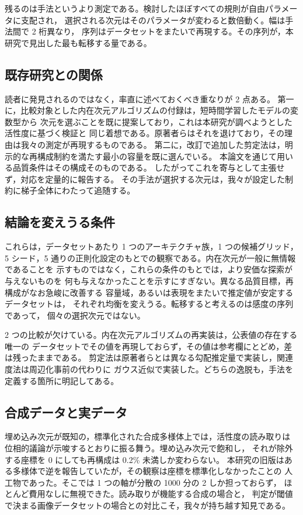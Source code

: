 \documentclass[11pt,a4paper]{jsarticle}
\begin{document}
残るのは手法というより測定である。検討したほぼすべての規則が自由パラメータに支配され，
選択される次元はそのパラメータが変わると数倍動く。幅は手法間で 2 桁異なり，
序列はデータセットをまたいで再現する。その序列が，本研究で見出した最も転移する量である。

\subsection{既存研究との関係}\label{sec:disc_related}

読者に発見されるのではなく，率直に述べておくべき重なりが 2 点ある。
第一に，比較対象とした内在次元アルゴリズムの付録は，短時間学習したモデルの変数型から
次元を選ぶことを既に提案しており，これは本研究が調べようとした活性度に基づく検証と
同じ着想である。原著者らはそれを退けており，その理由は我々の測定が再現するものである。
第二に，改訂で追加した剪定法は，明示的な再構成制約を満たす最小の容量を既に選んでいる。
本論文を通じて用いる品質条件はその構成そのものである。
したがってこれを寄与として主張せず，対応を定量的に報告する。
その手法が選択する次元は，我々が設定した制約に梯子全体にわたって追随する。

\subsection{結論を変えうる条件}\label{sec:disc_limits}

これらは，データセットあたり 1 つのアーキテクチャ族，1 つの候補グリッド，
5 シード，5 通りの正則化設定のもとでの観察である。内在次元が一般に無情報であることを
示すものではなく，これらの条件のもとでは，より安価な探索が与えないものを
何も与えなかったことを示すにすぎない。異なる品質目標，再構成がなお急峻に改善する
容量域，あるいは表現をまたいで推定値が安定するデータセットは，
それぞれ均衡を変えうる。転移すると考えるのは感度の序列であって，
個々の選択次元ではない。

2 つの比較が欠けている。内在次元アルゴリズムの再実装は，公表値の存在する唯一の
データセットでその値を再現しておらず，その値は参考欄にとどめ，差は残ったままである。
剪定法は原著者らとは異なる勾配推定量で実装し，関連度法は周辺化事前の代わりに
ガウス近似で実装した。どちらの逸脱も，手法を定義する箇所に明記してある。

\subsection{合成データと実データ}\label{sec:disc_synth}

埋め込み次元が既知の，標準化された合成多様体上では，活性度の読み取りは
位相的議論が示唆するとおりに振る舞う。埋め込み次元で飽和し，
それが除外する座標を 0 にしても再構成は 0.2\% 未満しか変わらない。
本研究の旧版はある多様体で逆を報告していたが，その観察は座標を標準化しなかったことの
人工物であった。そこでは 1 つの軸が分散の 1000 分の 2 しか担っておらず，
ほとんど費用なしに無視できた。読み取りが機能する合成の場合と，
判定が閾値で決まる画像データセットの場合との対比こそ，我々が持ち越す知見である。
\end{document}

